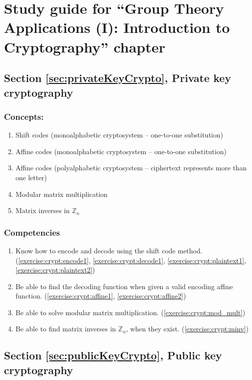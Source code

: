 \section{Study guide  for ``Group Theory Applications (I): Introduction to Cryptography''  chapter}
\label{sec:crypt:study} 
\subsection*{Section \ref{sec:privateKeyCrypto}, Private key cryptography}
\subsubsection*{Concepts:}
\begin{enumerate}
\item 
Shift codes (monoalphabetic cryptosystem – one-to-one substitution)
\item
Affine codes (monoalphabetic cryptosystem – one-to-one substitution)
\item
Affine codes (polyalphabetic cryptosystem – ciphertext represents more than one letter)
\item
Modular matrix multiplication
\item
Matrix inverses in ${\mathbb Z}_{n}$
\end{enumerate}

\subsubsection*{Competencies}
\begin{enumerate}
\item
Know how to encode and decode using the shift code method.   (\ref{exercise:crypt:encode1}, \ref{exercise:crypt:decode1}, \ref{exercise:crypt:plaintext1}, \ref{exercise:crypt:plaintext2})
\item
Be able to find the decoding function when given a valid encoding affine function.  (\ref{exercise:crypt:affine1}, \ref{exercise:crypt:affine2})
\item
Be able to solve modular matrix multiplication.  (\ref{exercise:crypt:mod_mult})
\item
Be able to find matrix inverses in ${\mathbb Z}_{n}$, when they exist.  (\ref{exercise:crypt:minv})
\end{enumerate}


\subsection*{Section \ref{sec:publicKeyCrypto}, Public key cryptography}
